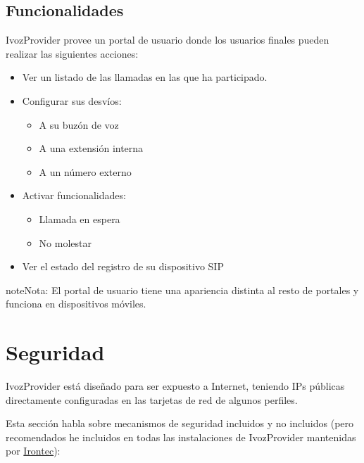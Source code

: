\documentclass[letterpaper,10pt,spanish]{sphinxmanual}
\begin{document}
\section{Funcionalidades}
\label{user_portal/features::doc}\label{user_portal/features:features}
IvozProvider provee un portal de usuario donde los usuarios finales pueden realizar las siguientes acciones:
\begin{itemize}
\item {} 
Ver un listado de las llamadas en las que ha participado.

\item {} 
Configurar sus desvíos:
\begin{itemize}
\item {} 
A su buzón de voz

\item {} 
A una extensión interna

\item {} 
A un número externo

\end{itemize}

\item {} 
Activar funcionalidades:
\begin{itemize}
\item {} 
Llamada en espera

\item {} 
No molestar

\end{itemize}

\item {} 
Ver el estado del registro de su dispositivo SIP

\end{itemize}

\begin{notice}{note}{Nota:}
El portal de usuario tiene una apariencia distinta al resto de portales y funciona en dispositivos móviles.
\end{notice}


\chapter{Seguridad}
\label{security_and_maintenance/security/index:security}\label{security_and_maintenance/security/index::doc}
IvozProvider está diseñado para ser expuesto a Internet, teniendo IPs públicas directamente configuradas en las tarjetas de red de algunos perfiles.

Esta sección habla sobre mecanismos de seguridad incluidos y no incluidos (pero recomendados he incluidos en todas las instalaciones de IvozProvider mantenidas por \href{https://www.irontec.com}{Irontec}):
\end{document}
